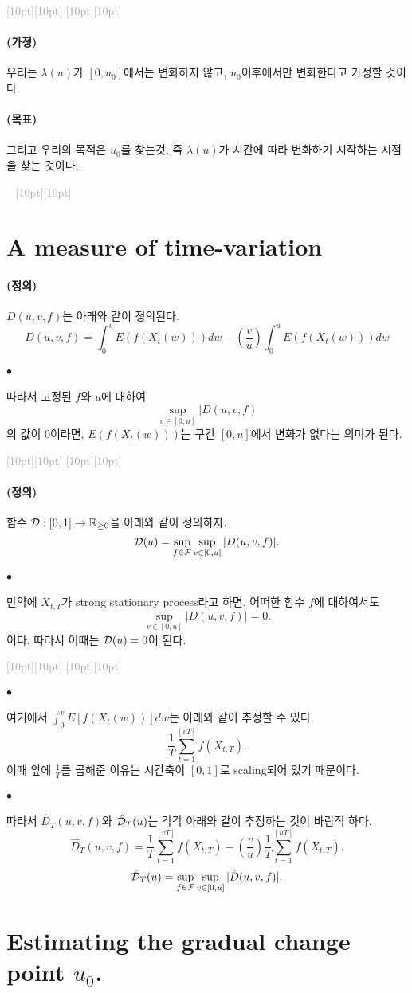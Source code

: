 \documentclass[12pt,oneside,english]{book}
\newcommand{\dash}{\vspace{2em}\noindent \textcolor{darkgray}{\hrulefill~ \raisebox{-2.5pt}[10pt][10pt]{\leafright \decofourleft \decothreeleft  \aldineright \decotwo \floweroneleft \decoone   \floweroneright \decotwo \aldineleft\decothreeright \decofourright \leafleft} ~  \hrulefill \\ \vspace{2em}}}
\newcommand{\rdash}{\noindent \textcolor{darkgray}{ \raisebox{-1.9pt}[10pt][10pt]{\leafright} \hrulefill \raisebox{-1.9pt}[10pt][10pt]{\leafright \decofourleft \decothreeleft  \aldineright \decotwo \floweroneleft \decoone}}}
\def\ck{\paragraph{\Large$\bullet$}\Large}
\def\goal{\paragraph{\Large(목표)}\Large}
\def\assume{\paragraph{\Large(가정)}\Large}
\def\dfn{\paragraph{\Large(정의)}\Large}
\begin{document}
\rdash

\assume 우리는 $\lambda(u)$가 $[0,u_0]$에서는 변화하지 않고, $u_0$이후에서만 변화한다고 가정할 것이다. 

\goal 그리고 우리의 목적은 $u_0$를 찾는것, 즉 $\lambda(u)$가 시간에 따라 변화하기 시작하는 시점을 찾는 것이다. 


\dash

\section{A measure of time-variation}

\dfn 
$D(u,v,f)$는 아래와 같이 정의된다. 
\[
D(u,v,f)=\int_0^v E(f(X_t(w)))dw-\left(\frac{v}{u}\right) \int_0^u E(f(X_t(w)))dw
\]

\ck 
따라서 고정된 $f$와 $u$에 대하여 
\[
\sup_{v\in[0,u]}|D(u,v,f)
\]
의 값이 0이라면, $E(f(X_t(w)))$는 구간 $[0,u]$에서 변화가 없다는 의미가 된다. 

\rdash

\dfn 
함수 ${\cal D}:[0,1] \rightarrow \mathbb{R}_{\geq 0}$을 아래와 같이 정의하자. 	
$${\cal D}(u)=\sup_{f \in {\cal F}}\sup_{v \in [0,u]} |D(u,v,f)|.$$

\ck 만약에 $X_{t,T}$가 strong stationary process라고 하면, 어떠한 함수 $f$에 대하여서도 
\[
\sup_{v \in [0,u]}|D(u,v,f)|=0.
\]
이다. 따라서 이때는 ${\cal D}(u)=0$이 된다. 

\rdash 

\ck 여기에서 $\int_0^vE[f(X_t(w))]dw$는 아래와 같이 추정할 수 있다. 
$$\frac{1}{T}\sum_{t=1}^{[vT]}f(X_{t,T}).$$
이때 앞에 $\frac{1}{T}$를 곱해준 이유는 시간축이 $[0,1]$로 scaling되어 있기 때문이다. 

\ck 따라서 $\hat{D}_T(u,v,f)$와 $\hat{\cal D}_T(u)$는 각각 아래와 같이 추정하는 것이 바람직 하다. 
$$\hat{D}_T(u,v,f)=\frac{1}{T}\sum_{t=1}^{[vT]}f(X_{t,T})-\left(\frac{v}{u}\right) \frac{1}{T} \sum_{t=1}^{[uT]}f(X_{t,T}).$$
$$\hat{\cal D}_T(u)=\sup_{f \in {\cal F}}\sup_{v \in [0,u]} |\hat{D}(u,v,f)|.$$

\section{Estimating the gradual change point $u_0$.}
\end{document}
